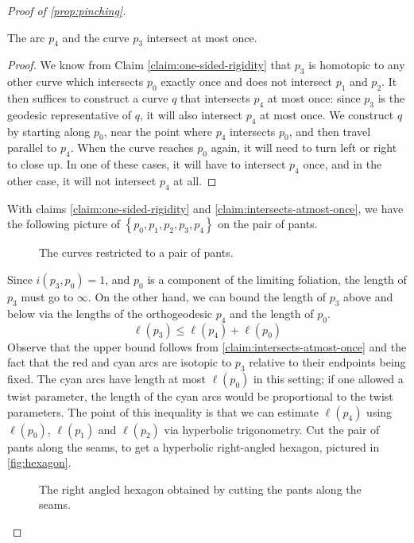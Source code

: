 \begin{proof}[Proof of \autoref{prop:pinching}]
  \begin{claim}
    \label{claim:intersects-atmost-once}
    The arc $p_4$ and the curve $p_3$ intersect at most once.
  \end{claim}
  \begin{proof}
    We know from Claim \ref{claim:one-sided-rigidity} that $p_3$ is homotopic to any other curve which intersects $p_0$ exactly once and does not intersect $p_1$ and $p_2$.
    It then suffices to construct a curve $q$ that intersects $p_4$ at most once: since $p_3$ is the geodesic representative of $q$, it will also intersect $p_4$ at most once.
    We construct $q$ by starting along $p_0$, near the point where $p_4$ intersects $p_0$, and then travel parallel to $p_4$.
    When the curve reaches $p_0$ again, it will need to turn left or right to close up. In one of these cases, it will have to intersect $p_4$ once, and in the other case, it will not intersect $p_4$ at all.
  \end{proof}
  With claims \ref{claim:one-sided-rigidity} and \ref{claim:intersects-atmost-once}, we have the following picture of $\left\{ p_0, p_1, p_2, p_3, p_4 \right\}$ on the pair of pants.
  \begin{figure}[h]
    \centering
    \caption{The curves restricted to a pair of pants.}
    \label{fig:pants}
  \end{figure}


  Since $i(p_3, p_0) = 1$, and $p_0$ is a component of the limiting foliation, the length of $p_3$ must go to $\infty$.
  On the other hand, we can bound the length of $p_3$ above and below via the lengths of the orthogeodesic $p_4$ and the length of $p_0$.
 \begin{equation}
   \label{eq:up-1}
   \ell(p_3) \leq \ell(p_4) + \ell(p_0)
 \end{equation}
 Observe that the upper bound follows from \autoref{claim:intersects-atmost-once} and the fact that the red and cyan arcs are isotopic to $p_3$ relative to their endpoints being fixed.
 The cyan arcs have length at most $\ell(p_0)$ in this setting; if one allowed a twist parameter, the length of the cyan arcs would be proportional to the twist parameters.
 The point of this inequality is that we can estimate $\ell(p_4)$ using $\ell(p_0)$, $\ell(p_1)$ and $\ell(p_2)$ via hyperbolic trigonometry.
 Cut the pair of pants along the seams, to get a hyperbolic right-angled hexagon, pictured in \autoref{fig:hexagon}.
 \begin{figure}[h]
   \centering
   \caption{The right angled hexagon obtained by cutting the pants along the seams.}
   \label{fig:hexagon}
 \end{figure}


\end{proof}

